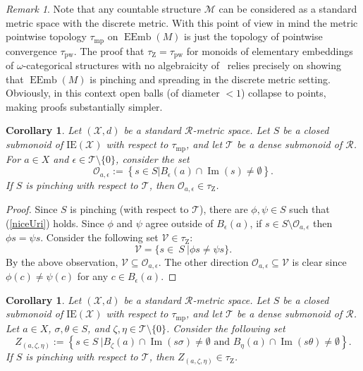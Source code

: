\documentclass{article}
\newtheorem{corollary}[theorem]{Corollary}
\theoremstyle{remark}
\newtheorem{remark}[theorem]{Remark}
\theoremstyle{definition}
\DeclareMathOperator{\EEmb}{EEmb}
\newcommand{\M}[0]{\mathcal{M}}
\DeclareMathOperator{\im}{Im}
\newcommand{\pw}[0]{\tau_{\mathrm{pw}}}
\newcommand{\zar}[0]{\tau_{\mathrm{Z}}}
\newcommand{\mpw}[0]{\tau_{\mathrm{mp}}}
\newcommand{\rr}[0]{\mathcal{R}}
\newcommand{\ie}[0]{\mathrm{IE}}
\begin{document}
{{{{{\begin{remark}  Note that any countable structure $\M$ can be considered as a standard metric space with the discrete metric. With this point of view in mind the metric pointwise topology $\mpw$ on $\EEmb(M)$ is just the topology of pointwise convergence $\pw$. The proof that $\zar=\pw$ for monoids of elementary embeddings of $\omega$-categorical structures with no algebraicity of~\cite{pinskerschindler} relies precisely on showing that $\EEmb(M)$ is pinching \cite[Lemma 3.6]{elliott2023polish} and spreading \cite[Lemma 3.6]{pinskerschindler} {in the discrete metric setting.}
Obviously, in this context open balls (of diameter $<1$) collapse to points, making proofs substantially simpler. 
\end{remark}

\begin{corollary}\label{Uaopen} Let $(\mathcal{X}, d)$ be a standard $\rr$-metric space. Let $S$ be a closed submonoid of $\ie(\mathcal{X})$ with respect to $\mpw$, and let $\mathcal{T}$ be a dense submonoid of $\rr$.  For $a\in X$ and $\epsilon\in \mathcal{T}\setminus\{0\}$, consider the set 
\[\mathcal{O}_{a,\epsilon}:=\left\{s\in S\vert B_{\epsilon}(a)\cap\im(s)\neq \emptyset\right\}.\]
If $S$ is pinching with respect to $\mathcal{T}$, then $\mathcal{O}_{a,\epsilon}\in\zar$.
\end{corollary}
\begin{proof} Since $S$ is pinching (with respect to $\mathcal{T}$), there are $\phi, \psi\in S$ such that (\ref{niceUri}) holds. Since $\phi$ and $\psi$ agree outside of $B_\epsilon(a)$,  if $s\in S\setminus \mathcal O_{a,\epsilon}$  then $\phi s=\psi s$. 
Consider the following set $\mathcal{V}\in\zar$:\[\mathcal{V}=\{s\in\ S \ \vert \phi s\neq \psi s\}.\]
By the above observation,  $\mathcal V\subseteq \mathcal O_{a,\epsilon}$. The other direction $\mathcal O_{a,\epsilon}\subseteq \mathcal V$ is clear since $\phi (c)\neq \psi (c)$ for any $c\in B_{\epsilon}(a)$.
\end{proof}
\begin{corollary}\label{Zopen} Let $(\mathcal{X}, d)$ be a standard $\rr$-metric space. Let $S$ be a closed submonoid of $\ie(\mathcal{X})$ with respect to $\mpw$, and let $\mathcal{T}$ be a dense submonoid of $\rr$. Let $a\in X$, $\sigma, \theta\in S$, and $\zeta,\eta\in \mathcal T\setminus\{0\}$. Consider the following set
\[Z_{(a, \zeta,\eta)}:=\left\{s\in S \ \vert B_{\zeta}(a)\cap\im(s\sigma)\neq \emptyset \text{ and }  B_{\eta}(a)\cap\im(s\theta)\neq \emptyset \right\}.\]
If $S$ is pinching with respect to $\mathcal{T}$, then  $Z_{(a, \zeta,\eta)}\in\zar$.


\end{corollary}}}}}}
\end{document}
